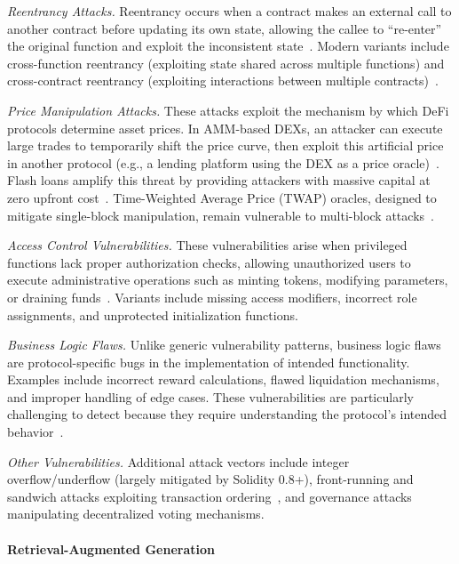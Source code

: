 \emph{Reentrancy Attacks.} Reentrancy occurs when a contract makes an external call to another contract before updating its own state, allowing the callee to ``re-enter'' the original function and exploit the inconsistent state~\cite{reentrancysurvey2025}. Modern variants include cross-function reentrancy (exploiting state shared across multiple functions) and cross-contract reentrancy (exploiting interactions between multiple contracts)~\cite{blockwatchdog2024,slise2024}.

\emph{Price Manipulation Attacks.} These attacks exploit the mechanism by which DeFi protocols determine asset prices. In AMM-based DEXs, an attacker can execute large trades to temporarily shift the price curve, then exploit this artificial price in another protocol (e.g., a lending platform using the DEX as a price oracle)~\cite{defiranger2021,pomabuster2024}. Flash loans amplify this threat by providing attackers with massive capital at zero upfront cost~\cite{qin2020flashloan}. Time-Weighted Average Price (TWAP) oracles, designed to mitigate single-block manipulation, remain vulnerable to multi-block attacks~\cite{oraclesurvey2023}.

\emph{Access Control Vulnerabilities.} These vulnerabilities arise when privileged functions lack proper authorization checks, allowing unauthorized users to execute administrative operations such as minting tokens, modifying parameters, or draining funds~\cite{GPTScan}. Variants include missing access modifiers, incorrect role assignments, and unprotected initialization functions.

\emph{Business Logic Flaws.} Unlike generic vulnerability patterns, business logic flaws are protocol-specific bugs in the implementation of intended functionality. Examples include incorrect reward calculations, flawed liquidation mechanisms, and improper handling of edge cases. These vulnerabilities are particularly challenging to detect because they require understanding the protocol's intended behavior~\cite{iaudit2025}.

\emph{Other Vulnerabilities.} Additional attack vectors include integer overflow/underflow (largely mitigated by Solidity 0.8+), front-running and sandwich attacks exploiting transaction ordering~\cite{zhou2021flashboys}, and governance attacks manipulating decentralized voting mechanisms.

\paragraph{\textbf{Retrieval-Augmented Generation}}

